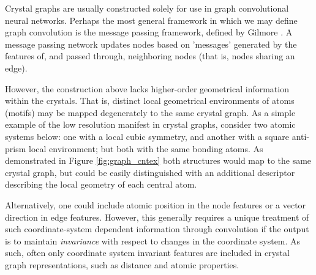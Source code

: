 \documentclass[twoside,twocolumn,9pt]{article}
\begin{document}
Crystal graphs are usually constructed solely for use in graph convolutional neural networks. Perhaps the most general framework in which we may define graph convolution is the message passing framework, defined by Gilmore \cite{mpnn}.
A message passing network updates nodes based on 'messages' generated by the features of, and passed through, neighboring nodes (that is, nodes sharing an edge).%





However, the construction above lacks higher-order geometrical information within the crystals. That is, distinct local geometrical environments of atoms (motifs) may be mapped degenerately to the same crystal graph.
As a simple example of the low resolution manifest in crystal graphs, consider two atomic systems below: one with a local cubic symmetry, and another with a square anti-prism local environment; but both with the same bonding atoms. As demonstrated in Figure \ref{fig:graph_cntex} both structures would map to the same crystal graph, but could be easily distinguished with an additional descriptor describing the local geometry of each central atom.

Alternatively, one could include atomic position in the node features or a vector direction in edge features. However, this generally requires a unique treatment of such coordinate-system dependent information through convolution if the output is to maintain \textit{invariance} with respect to changes in the coordinate system. As such, often only coordinate system invariant features are included in crystal graph representations, such as distance and atomic properties. 
\end{document}

